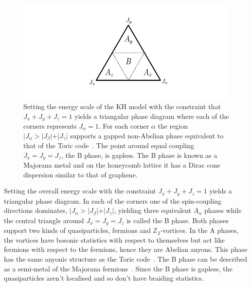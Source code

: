 \hypertarget{fig:KH_phase_diagram}{%
\begin{figure}
\centering
\includegraphics[width=1\textwidth,height=\textheight]{figure_code/background_chapter/KH_phase_diagram}
\caption[{Kitaev Honeycomb Model Phase Diagram}]{Setting the energy scale of the KH model with the constraint that \(J_x + J_y + J_z = 1\) yields a triangular phase diagram where each of the corners represents \(J_\alpha = 1\). For each corner \(\alpha\) the region \(|J_\alpha > |J_\beta| + |J_\gamma|\) supports a gapped non-Abelian phase equivalent to that of the Toric code~\autocite{kitaev1997quantum,kitaev_fault-tolerant_2003}. The point around equal coupling \(J_x = J_y = J_z\), the B phase, is gapless. The B phase is known as a Majorana metal and on the honeycomb lattice it has a Dirac cone dispersion similar to that of graphene.}
\label{fig:KH_phase_diagram}
\end{figure}
}

Setting the overall energy scale with the constraint \(J_x + J_y + J_z = 1\) yields a triangular phase diagram. In each of the corners one of the spin-coupling directions dominates, \(|J_\alpha > |J_\beta| + |J_\gamma|\), yielding three equivalent \(A_\alpha\) phases while the central triangle around \(J_x = J_y = J_z\) is called the B phase. Both phases support two kinds of quasiparticles, fermions and \(\mathbb{Z}_2\)-vortices. In the A phases, the vortices have bosonic statistics with respect to themselves but act like fermions with respect to the fermions, hence they are Abelian anyons. This phase has the same anyonic structure as the Toric code~\autocite{kitaev_fault-tolerant_2003}. The B phase can be described as a semi-metal of the Majorana fermions~\autocite{TrebstPhysRep2022}. Since the B phase is gapless, the quasiparticles aren't localised and so don't have braiding statistics.

